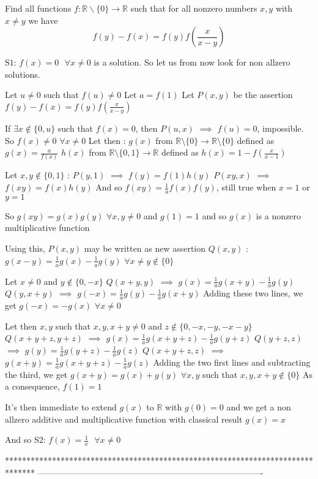 \begin{solution}
	\begin{tcolorbox}Find all functions $f:\mathbb{R}\backslash\{0\}\to\mathbb{R}$ such that for all nonzero numbers $x,y$ with $x\neq y$  we have
\[f(y)-f(x)=f(y)f\left (\frac{x}{x-y}\right)\]\end{tcolorbox}
$\boxed{\text{S1: }f(x)=0\text{ }\forall x\ne 0}$ is a solution. So let us from now look for non allzero solutions.

Let $u\ne 0$ such that $f(u)\ne 0$
Let $a=f(1)$
Let $P(x,y)$ be the assertion $f(y)-f(x)=f(y)f(\frac x{x-y})$

If $\exists x\notin\{0,u\}$ such that $f(x)=0$, then $P(u,x)$ $\implies$ $f(u)=0$, impossible. So $f(x)\ne 0$ $\forall x\ne 0$
Let then :
 $g(x)$ from $\mathbb R\setminus\{0\}\to\mathbb R\setminus\{0\}$ defined as $g(x)=\frac{a}{f(x)}$
 $h(x)$ from $\mathbb R\setminus\{0,1\}\to\mathbb R$ defined as $h(x)=1-f(\frac x{x-1})$

Let $x,y\notin\{0,1\}$ :
$P(y,1)$ $\implies$ $f(y)=f(1)h(y)$
$P(xy,x)$ $\implies$ $f(xy)=f(x)h(y)$
And so $f(xy)=\frac 1{a}f(x)f(y)$, still true when $x=1$ or $y=1$

So $g(xy)=g(x)g(y)$ $\forall x,y\ne 0$ and $g(1)=1$ and so $g(x)$ is a nonzero multiplicative function

Using this, $P(x,y)$ may be written as new assertion $Q(x,y)$ : $g(x-y)=\frac 1ag(x)-\frac 1ag(y)$ $\forall x\ne y\notin\{0\}$

Let $x\ne 0$ and $y\notin\{0,-x\}$
$Q(x+y,y)$ $\implies$ $g(x)=\frac 1ag(x+y)-\frac 1ag(y)$
$Q(y,x+y)$ $\implies$ $g(-x)=\frac 1ag(y)-\frac 1ag(x+y)$
Adding these two lines, we get $g(-x)=-g(x)$ $\forall x\ne 0$

Let then $x,y$ such that $x,y,x+y\ne 0$ and $z\notin\{0,-x,-y,-x-y\}$
$Q(x+y+z,y+z)$ $\implies$ $g(x)=\frac 1ag(x+y+z)-\frac 1ag(y+z)$
$Q(y+z,z)$ $\implies$ $g(y)=\frac 1ag(y+z)-\frac 1ag(z)$
$Q(x+y+z,z)$ $\implies$ $g(x+y)=\frac 1ag(x+y+z)-\frac 1ag(z)$
Adding the two first lines and subtracting the third, we get $g(x+y)=g(x)+g(y)$ $\forall x,y$ such that $x,y,x+y\notin\{0\}$
As a consequence, $f(1)=1$

It's then immediate to extend $g(x)$ to $\mathbb R$ with $g(0)=0$ and we get a non allzero additive and multiplicative function with classical result $g(x)=x$

And so $\boxed{\text{S2: }f(x)=\frac 1x\text{ }\forall x\ne 0}$
\end{solution}
*******************************************************************************
-------------------------------------------------------------------------------

